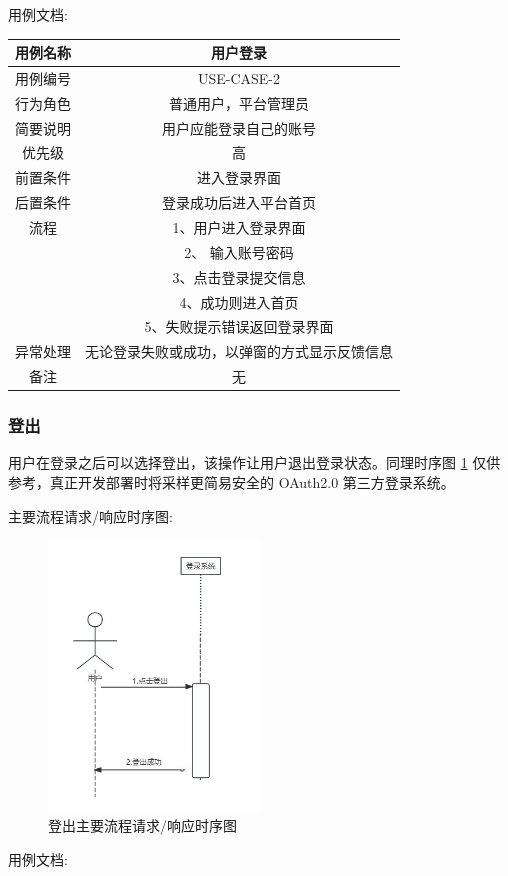 \documentclass[12pt]{ctexart} %
\begin{document}
用例文档:

\begin{tabular}{|c|c|}
  \hline
  用例名称& 用户登录\\
  \hline
  用例编号 & USE-CASE-2\\
  \hline
  行为角色 & 普通用户，平台管理员\\
  \hline
  简要说明 & 用户应能登录自己的账号\\
  \hline
  优先级 & 高\\
  \hline
  前置条件 & 进入登录界面\\
  \hline
  后置条件 & 登录成功后进入平台首页\\
  \hline
  流程 & 1、用户进入登录界面\\
      & 2、 输入账号密码\\
      & 3、点击登录提交信息\\
      & 4、成功则进入首页\\
      & 5、失败提示错误返回登录界面\\
  \hline
  异常处理 & 无论登录失败或成功，以弹窗的方式显示反馈信息\\
  \hline
  备注 & 无\\
  \hline
\end{tabular}

\subsubsection{登出}
用户在登录之后可以选择登出，该操作让用户退出登录状态。同理时序图 \ref{fig:logout-sequence} 仅供参考，真正开发部署时将采样更简易安全的 OAuth2.0 第三方登录系统。

主要流程请求/响应时序图:
\begin{figure}[ht]
  \centering
  \includegraphics[width=0.5\textwidth]{yongli3.jpg}
  \caption{登出主要流程请求/响应时序图}
  \label{fig:logout-sequence} %
\end{figure}
用例文档:
\end{document}
